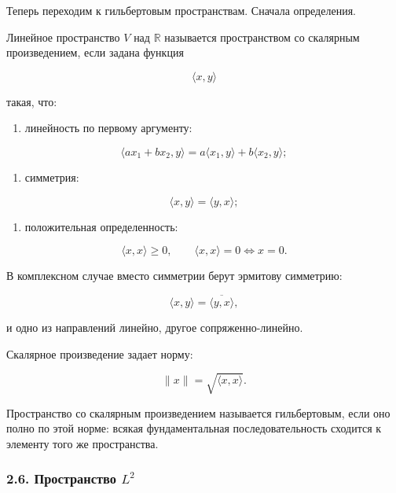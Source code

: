 \documentclass[
  11pt,
  a4paper,
]{article}
\providecommand{\tightlist}{%
  \setlength{\itemsep}{0pt}\setlength{\parskip}{0pt}}
\begin{document}
Теперь переходим к гильбертовым пространствам. Сначала определения.

Линейное пространство \(V\) над \(\mathbb R\) называется пространством
со скалярным произведением, если задана функция

\[
\langle x,y\rangle
\]

такая, что:

\begin{enumerate}
\def\labelenumi{\arabic{enumi}.}
\tightlist
\item
  линейность по первому аргументу:
\end{enumerate}

\[
\langle ax_1+bx_2,y\rangle
=
a\langle x_1,y\rangle+b\langle x_2,y\rangle;
\]

\begin{enumerate}
\def\labelenumi{\arabic{enumi}.}
\setcounter{enumi}{1}
\tightlist
\item
  симметрия:
\end{enumerate}

\[
\langle x,y\rangle=\langle y,x\rangle;
\]

\begin{enumerate}
\def\labelenumi{\arabic{enumi}.}
\setcounter{enumi}{2}
\tightlist
\item
  положительная определенность:
\end{enumerate}

\[
\langle x,x\rangle\ge0,
\qquad
\langle x,x\rangle=0\Longleftrightarrow x=0.
\]

В комплексном случае вместо симметрии берут эрмитову симметрию:

\[
\langle x,y\rangle=\overline{\langle y,x\rangle},
\]

и одно из направлений линейно, другое сопряженно-линейно.

Скалярное произведение задает норму:

\[
\|x\|=\sqrt{\langle x,x\rangle}.
\]

Пространство со скалярным произведением называется гильбертовым, если
оно полно по этой норме: всякая фундаментальная последовательность
сходится к элементу того же пространства.

\subsubsection{\texorpdfstring{2.6. Пространство
\(L^2\)}{2.6. Пространство L\^{}2}}\label{ux43fux440ux43eux441ux442ux440ux430ux43dux441ux442ux432ux43e-l2}
\end{document}
